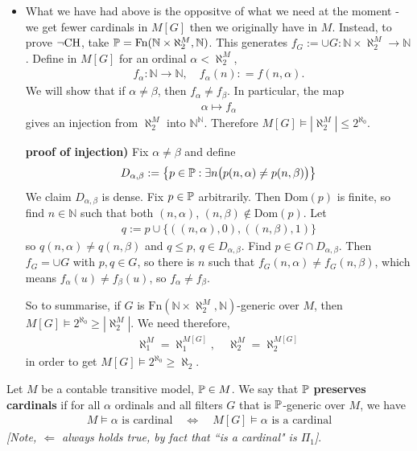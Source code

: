 \documentclass[12pt,a4paper]{article}
\newenvironment{subproof}
{\begin{changemargin}{0.5cm}{0.5cm} 
	}%
	{\end{changemargin}
}
\begin{document}
\begin{itemize}
\item What we have had above is the oppositve of what we need at the moment - we get fewer cardinals in $M[G]$ then we originally have in $M$. Instead, to prove $\neg \text{CH}$, take $\mathbb{P} = \text{Fn}(\mathbb{N} \times \aleph_2^M, \mathbb{N})$. This generates $f_G := \cup G : \mathbb{N} \times \aleph_2^M \rightarrow \mathbb{N}$. Define in $M[G]$ for an ordinal $\alpha < \aleph_2^M$,
\begin{align*}
f_{\alpha} : \mathbb{N} \rightarrow \mathbb{N}, \quad f_{\alpha}(n) : = f(n, \alpha). 
\end{align*} 
We will show that if $\alpha \neq \beta$, then $f_{\alpha} \neq f_{\beta}$. In particular, the map
\begin{align*}
\alpha \mapsto f_{\alpha}
\end{align*}
gives an injection from $\aleph_2^M$ into $\mathbb{N}^{\mathbb{N}}$. Therefore $M[G] \models |\aleph_2^M| \leq 2^{\aleph_0}$.
\begin{subproof}
\textbf{proof of injection)} Fix $\alpha \neq \beta$ and define
\begin{align*}
D_{\alpha , \beta} : = \big\{p\in \mathbb{P} : \exists n \big(p(n, \alpha) \neq p(n, \beta)\big)\big\}
\end{align*}
We claim $D_{\alpha, \beta}$ is dense. Fix $p\in \mathbb{P}$ arbitrarily. Then $\text{Dom}(p)$ is finite, so find $n\in \mathbb{N}$ such that both $(n, \alpha)$, $(n, \beta) \not\in \text{Dom}(p)$. Let
\begin{align*}
q:= p \cup \{((n, \alpha), 0), ((n, \beta), 1)\}
\end{align*}
so $q(n, \alpha) \neq q(n, \beta)$ and $q\leq p$, $q\in D_{\alpha, \beta}$. Find $p\in  G\cap D_{\alpha, \beta}$. Then $f_G =\cup G$ with $p,q\in G$, so there is $n$ such that $f_G(n, \alpha) \neq f_G(n, \beta)$, which means $f_{\alpha}(u) \neq f_{\beta}(u)$, so $f_{\alpha} \neq f_{\beta}$.

\eop 
\end{subproof}
So to summarise, if $G$ is $\text{Fn}(\mathbb{N} \times \aleph_2^M, \mathbb{N})$-generic over $M$, then $M[G] \models 2^{\aleph_0} \geq |\aleph_2^M|$. We need therefore,
\begin{align*}
\aleph_1^M = \aleph_1^{M[G]}, \quad \aleph_2^M = \aleph_2^{M[G]}
\end{align*} 
in order to get $M[G] \models 2^{\aleph_0} \geq \aleph_2$.
\end{itemize}
\s

 Let $M$ be a contable transitive model, $\mathbb{P} \in M$. We say that $\mathbb{P}$ \textbf{preserves cardinals} if for all $\alpha$ ordinals and all filters $G$ that is $\mathbb{P}$-generic over $M$, we have
\begin{align*}
M \models \alpha \text{ is cardinal} \quad \Leftrightarrow \quad M[G] \models \alpha \text{ is a cardinal}
\end{align*}
\emph{[Note,  $\Leftarrow$ always holds true, by fact that ``is a cardinal" is $\Pi_1$]}.
\s
\end{document}
